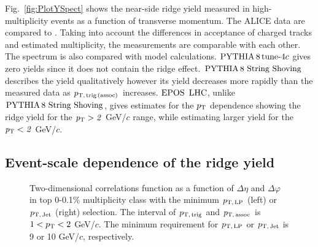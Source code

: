 Fig.~\ref{fig:PlotYSpect} shows the near-side ridge yield measured in high-multiplicity events as a function of transverse momentum. The ALICE data are compared to \cite{Khachatryan:2015lva}.
Taking into account the differences in acceptance of charged tracks and estimated multiplicity, the measurements are comparable with each other. The spectrum is also compared with model calculations. $\mathrm{PYTHIA}\,8\,\mathrm{tune}{\text -}4c$ gives zero yields since it does not contain the ridge effect. ${\mathrm{PYTHIA}\,8~\mathrm{String}~}\mathrm{Shoving}$ describes the yield qualitatively however its yield decreases more rapidly than the measured data as $p_\mathrm{T,\,trig\,(assoc)}$ increases. ${\mathrm{EPOS}\,~\mathrm{LHC}}$, unlike ${\mathrm{PYTHIA}\,8~\mathrm{String}~}\mathrm{Shoving}$, gives estimates for the $p_\mathrm{T}$ dependence showing the ridge yield for the $\it{p}_{\rm{T}}>2$ GeV/$c$ range, while estimating larger yield for the $\it{p}_{\rm{T}}<2$ GeV/$c$.

\subsection{Event-scale dependence of the ridge yield}
\begin{figure}[h!]
	\centering
	\caption{ Two-dimensional correlations function as a function of $\Delta\eta$ and $\Delta\varphi$ in top 0-0.1\% multiplicity class with the minimum $p_\mathrm{T,\,LP}$ (left) or $p_\mathrm{T,\,Jet}$ (right) selection. The interval of $p_\mathrm{T,\,trig}$ and $p_\mathrm{T,\,assoc}$ is $1<p_\mathrm{T}<2$ GeV/$c$. The minimum requirement for $p_\mathrm{T,\,LP}$ or $p_\mathrm{T,\,Jet}$ is 9 or 10 GeV/$c$, respectively. }
	\label{fig:PlotCorrHMTSel}
\end{figure}

